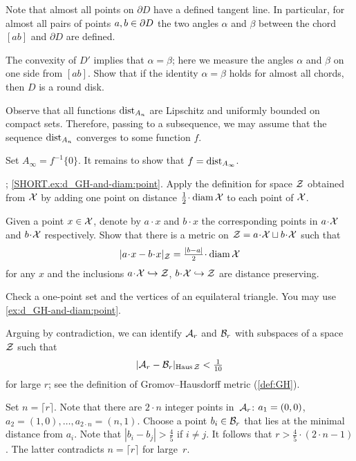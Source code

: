 Note that almost all points on $\partial D$ have a defined tangent line.
In particular, for almost all pairs of points $a,b\z\in\partial D$ the two angles $\alpha$ and $\beta$ between the chord $[ab]$ and $ \partial D$ are defined.

The convexity of $D'$ implies that $\alpha=\beta$;
here we measure the angles $\alpha$ and $\beta$ on one side from $[ab]$.
Show that if the identity $\alpha=\beta$ holds for almost all chords, then $D$ is a round disk. 


Observe that all functions $\mathrm{dist}_{A_n}$ are Lipschitz and uniformly bounded on compact sets.
Therefore, passing to a subsequence, we may assume that the sequence $\mathrm{dist}_{A_n}$ converges to some function $f$.

Set $A_\infty=f^{-1}\{0\}$.
It remains to show that $f=\mathrm{dist}_{A_\infty}$.


\parbf{\ref{ex:d_GH-and-diam}};
\ref{SHORT.ex:d_GH-and-diam:point}.
Apply the definition for space $\mathcal{Z}$ obtained from $\mathcal{X}$ by adding one point on distance $\tfrac12\cdot\diam \spc{X}$ to each point of $\mathcal{X}$.

Given a point $x\in\mathcal{X}$, denote by $a\cdot x$ and $b\cdot x$ the corresponding points in $a\cdot\spc{X}$ and $b\cdot \spc{X}$ respectively.
Show that there is a metric on $\spc{Z}\z=a\cdot\spc{X}\sqcup b\cdot\spc{X}$ such that 
\[|a\cdot x-b\cdot x|_{\spc{Z}}=\tfrac{|b-a|}2\cdot\diam\spc{X}\]
for any $x$ and the inclusions
$a\cdot\spc{X}\hookrightarrow\spc{Z}$,
$b\cdot\spc{X}\hookrightarrow\spc{Z}$ are distance preserving.

Check a one-point set and the vertices of an equilateral triangle.
You may use \ref{ex:d_GH-and-diam:point}.


Arguing by contradiction,
we can identify $\mathcal{A}_r$ and $\mathcal{B}_r$ with subspaces of a space $\mathcal{Z}$
such that 
\[|\mathcal{A}_r-\mathcal{B}_r|_{\operatorname{\rm Haus}\nolimits \mathcal{Z}}<\tfrac1{10}\]
for large $r$; see the definition of Gromov--Hausdorff metric (\ref{def:GH}).

Set $n=\lceil r \rceil$.
Note that there are $2\cdot n$ integer points in~$\mathcal{A}_r$: 
$a_1\z=(0,0)$, $a_2=(1,0),\dots,a_{2\cdot n}=(n,1)$.
Choose a point $b_i\in \mathcal{B}_r$ that lies at the minimal distance from $a_i$.
Note that $|b_i-b_j|>\tfrac 45$ if $i\ne j$.
It follows that $r>\tfrac 45\cdot (2\cdot n-1)$.
The latter contradicts $n=\lceil r \rceil$ for large~$r$.

